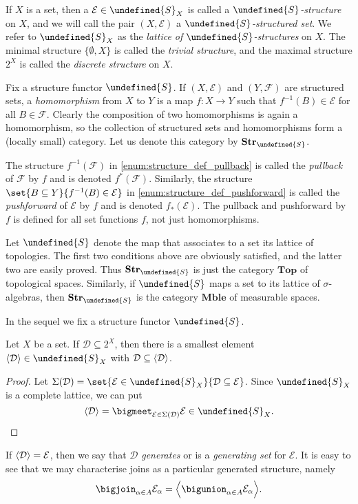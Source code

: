 \documentclass[article, a4paper, 11pt, oneside]{memoir}
\let\mathfrak\undefined
\numberwithin{equation}{chapter}
\newcommand{\calE}{\mathcal{E}}
\newcommand{\calD}{\mathcal{D}}
\newcommand{\calF}{\mathcal{F}}
\newcommand{\strucS}{\mathfrak{S}}
\DeclarePairedDelimiter{\gen}{\langle}{\rangle} %
\newcommand{\powerset}[1]{2^{#1}}
\newcommand{\ncat}[1]{\mathbf{#1}} %
\newcommand{\catTop}{\ncat{Top}} %
\newcommand{\catMble}{\ncat{Mble}} %
\newcommand{\catStruc}[1]{\ncat{Str}_{#1}} %
\newcommand{\catStrucS}{\catStruc{\strucS}} %
\begin{document}
If $X$ is a set, then a $\calE \in \strucS_X$ is called a \emph{$\strucS$-structure} on $X$, and we will call the pair $(X, \calE)$ a \emph{$\strucS$-structured set}. We refer to $\strucS_X$ as the \emph{lattice of $\strucS$-structures} on $X$. The minimal structure $\{\emptyset, X\}$ is called the \emph{trivial structure}, and the maximal structure $\powerset{X}$ is called the \emph{discrete structure} on $X$.

Fix a structure functor $\strucS$. If $(X, \calE)$ and $(Y, \calF)$ are structured sets, a \emph{homomorphism} from $X$ to $Y$ is a map $f \colon X \to Y$ such that $f^{-1}(B) \in \calE$ for all $B \in \calF$. Clearly the composition of two homomorphisms is again a homomorphism, so the collection of structured sets and homomorphisms form a (locally small) category. Let us denote this category by $\catStrucS$.

The structure $f^{-1}(\calF)$ in \cref{enum:structure_def_pullback} is called the \emph{pullback} of $\calF$ by $f$ and is denoted $f^*(\calF)$. Similarly, the structure $\set{B \subseteq Y}{f^{-1}(B) \in \calE}$ in \cref{enum:structure_def_pushforward} is called the \emph{pushforward} of $\calE$ by $f$ and is denoted $f_*(\calE)$. The pullback and pushforward by $f$ is defined for all set functions $f$, not just homomorphisms.

\begin{example}
    Let $\strucS$ denote the map that associates to a set its lattice of topologies. The first two conditions above are obviously satisfied, and the latter two are easily proved. Thus $\catStrucS$ is just the category $\catTop$ of topological spaces. Similarly, if $\strucS$ maps a set to its lattice of $\sigma$-algebras, then $\catStrucS$ is the category $\catMble$ of measurable spaces.
\end{example}

In the sequel we fix a structure functor $\strucS$.

\begin{lemma}
    Let $X$ be a set. If $\calD \subseteq \powerset{X}$, then there is a smallest element $\gen{\calD} \in \strucS_X$ with $\calD \subseteq \gen{\calD}$.
\end{lemma}

\begin{proof}
    Let $\Sigma(\calD) = \set{\calE \in \strucS_X}{\calD \subseteq \calE}$. Since $\strucS_X$ is a complete lattice, we can put
    \begin{equation*}
        \gen{\calD} = \bigmeet_{\calE \in \Sigma(\calD)} \calE \in \strucS_X.
    \end{equation*}
\end{proof}
%
If $\gen{\calD} = \calE$, then we say that $\calD$ \emph{generates} or is a \emph{generating set} for $\calE$. It is easy to see that we may characterise joins as a particular generated structure, namely
%
\begin{equation}
    \label{eq:join_as_generated_structure}
    \bigjoin_{\alpha \in A} \calE_\alpha
        = \gen[\Big]{ \bigunion_{\alpha \in A} \calE_\alpha }.
\end{equation}
\end{document}
